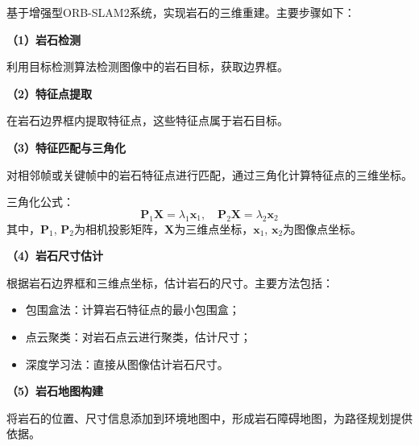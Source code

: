 基于增强型ORB-SLAM2系统，实现岩石的三维重建。主要步骤如下：

\textbf{（1）岩石检测}

利用目标检测算法检测图像中的岩石目标，获取边界框。

\textbf{（2）特征点提取}

在岩石边界框内提取特征点，这些特征点属于岩石目标。

\textbf{（3）特征匹配与三角化}

对相邻帧或关键帧中的岩石特征点进行匹配，通过三角化计算特征点的三维坐标。

三角化公式：
\begin{equation}
    \mathbf{P}_1 \mathbf{X} = \lambda_1 \mathbf{x}_1, \quad \mathbf{P}_2 \mathbf{X} = \lambda_2 \mathbf{x}_2
    \label{eq:triangulation}
\end{equation}
其中，$\mathbf{P}_1$, $\mathbf{P}_2$为相机投影矩阵，$\mathbf{X}$为三维点坐标，$\mathbf{x}_1$, $\mathbf{x}_2$为图像点坐标。

\textbf{（4）岩石尺寸估计}

根据岩石边界框和三维点坐标，估计岩石的尺寸。主要方法包括：
\begin{itemize}
    \item 包围盒法：计算岩石特征点的最小包围盒；
    \item 点云聚类：对岩石点云进行聚类，估计尺寸；
    \item 深度学习法：直接从图像估计岩石尺寸。
\end{itemize}

\textbf{（5）岩石地图构建}

将岩石的位置、尺寸信息添加到环境地图中，形成岩石障碍地图，为路径规划提供依据。
